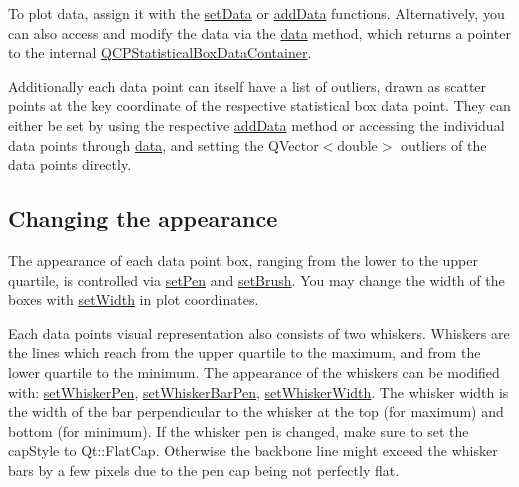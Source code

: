 To plot data, assign it with the \mbox{\hyperlink{class_q_c_p_statistical_box_a08a6da55822bad825ee25a8069b9b52f}{set\+Data}} or \mbox{\hyperlink{class_q_c_p_statistical_box_a9a8739c5b8291db8fd839e892fc8f478}{add\+Data}} functions. Alternatively, you can also access and modify the data via the \mbox{\hyperlink{class_q_c_p_statistical_box_a728e501413eaf191544014173d52dfbc}{data}} method, which returns a pointer to the internal \mbox{\hyperlink{qcustomplot_8h_a8b773c0c35f8f924701ced6e9915e4c7}{Q\+C\+P\+Statistical\+Box\+Data\+Container}}.

Additionally each data point can itself have a list of outliers, drawn as scatter points at the key coordinate of the respective statistical box data point. They can either be set by using the respective \mbox{\hyperlink{class_q_c_p_statistical_box_a026f2790b530d6f29312254ecb1e7c1e}{add\+Data}} method or accessing the individual data points through \mbox{\hyperlink{class_q_c_p_statistical_box_a728e501413eaf191544014173d52dfbc}{data}}, and setting the {\ttfamily Q\+Vector$<$double$>$ outliers} of the data points directly.\hypertarget{class_q_c_p_statistical_box_qcpstatisticalbox-appearance}{}\subsection{Changing the appearance}\label{class_q_c_p_statistical_box_qcpstatisticalbox-appearance}
The appearance of each data point box, ranging from the lower to the upper quartile, is controlled via \mbox{\hyperlink{class_q_c_p_abstract_plottable_ab74b09ae4c0e7e13142fe4b5bf46cac7}{set\+Pen}} and \mbox{\hyperlink{class_q_c_p_abstract_plottable_a7a4b92144dca6453a1f0f210e27edc74}{set\+Brush}}. You may change the width of the boxes with \mbox{\hyperlink{class_q_c_p_statistical_box_a0b62775bd67301b1eba5c785f2b26f14}{set\+Width}} in plot coordinates.

Each data point\textquotesingle{}s visual representation also consists of two whiskers. Whiskers are the lines which reach from the upper quartile to the maximum, and from the lower quartile to the minimum. The appearance of the whiskers can be modified with\+: \mbox{\hyperlink{class_q_c_p_statistical_box_a4a5034cb3b9b040444df05ab1684620b}{set\+Whisker\+Pen}}, \mbox{\hyperlink{class_q_c_p_statistical_box_aa8d3e503897788e1abf68dc74b5f147f}{set\+Whisker\+Bar\+Pen}}, \mbox{\hyperlink{class_q_c_p_statistical_box_adf378812446bd66f34d1f7f293d991cd}{set\+Whisker\+Width}}. The whisker width is the width of the bar perpendicular to the whisker at the top (for maximum) and bottom (for minimum). If the whisker pen is changed, make sure to set the {\ttfamily cap\+Style} to {\ttfamily Qt\+::\+Flat\+Cap}. Otherwise the backbone line might exceed the whisker bars by a few pixels due to the pen cap being not perfectly flat.

